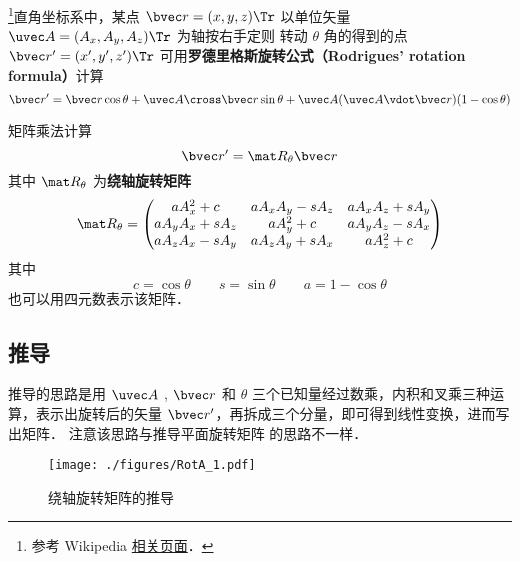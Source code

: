 

\footnote{参考 Wikipedia \href{https://en.wikipedia.org/wiki/Rodrigues'_rotation_formula}{相关页面}．}直角坐标系中，某点 $\bvec r=(x,y,z)\Tr$ 以单位矢量 $\uvec A=(A_x, A_y, A_z)\Tr$ 为轴按右手定则%
转动 $\theta$ 角的得到的点 $\bvec r'=(x',y',z')\Tr$ 可用\textbf{罗德里格斯旋转公式（Rodrigues' rotation formula）}计算
\begin{equation}
\bvec r' = \bvec r \cos\theta + \uvec A \cross \bvec r \sin\theta + \uvec A (\uvec A \vdot \bvec r) (1 - \cos\theta)
\end{equation}


矩阵乘法计算
\begin{equation}
\bvec r' = \mat R_\theta \bvec r
\end{equation}
其中 $\mat R_\theta$ 为\textbf{绕轴旋转矩阵}
\begin{equation}
\mat R_\theta =
\begin{pmatrix}
a A_x^2 + c & a A_x A_y - s A_z & a A_x A_z + s A_y\\
a A_y A_x + s A_z & a A_y^2 + c & a A_y A_z - s A_x\\
a A_z A_x - s A_y & a A_z A_y + s A_x & a A_z^2 + c
\end{pmatrix}\end{equation}
其中
\begin{equation}
c = \cos\theta \qquad s = \sin\theta \qquad a = 1 - \cos\theta
\end{equation}
也可以用四元数表示该矩阵．

\subsection{推导}
推导的思路是用 $\uvec A$ , $\bvec r$ 和 $\theta $ 三个已知量经过数乘，内积和叉乘三种运算，表示出旋转后的矢量 $\bvec r'$，再拆成三个分量，即可得到线性变换，进而写出矩阵． 注意该思路与推导平面旋转矩阵 的思路不一样．
\begin{figure}[ht]
\centering
\texttt{[image: ./figures/RotA\_1.pdf]}
\caption{绕轴旋转矩阵的推导}
\end{figure} 

